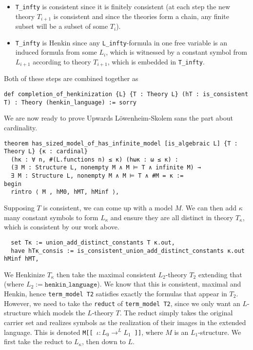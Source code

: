 \begin{itemize}
  \item
        \texttt{T\_infty} is consistent since it is finitely consistent
        (at each step the new theory $T_{i+1}$ is consistent
        and since the theories form a chain,
        any finite subset will be a subset of some $T_{i}$).
  \item
        \texttt{T\_infty} is Henkin since any \texttt{L\_infty}-formula in one free variable
        is an induced formula from some $L_{i}$, which is witnessed by a constant symbol
        from $L_{i+1}$ according to theory $T_{i+1}$, which is embedded in \texttt{T\_infty}.
\end{itemize}

Both of these steps are combined together as

\begin{lstlisting}
def completion_of_henkinization {L} {T : Theory L} (hT : is_consistent T) : Theory (henkin_language) := sorry
\end{lstlisting}

We are now ready to prove Upwards L\"{o}wenheim-Skolem
sans the part about cardinality.

\begin{lstlisting}
theorem has_sized_model_of_has_infinite_model [is_algebraic L] {T : Theory L} {κ : cardinal}
  (hκ : ∀ n, #(L.functions n) ≤ κ) (hωκ : ω ≤ κ) :
  (∃ M : Structure L, nonempty M ∧ M ⊨ T ∧ infinite M) →
  ∃ M : Structure L, nonempty M ∧ M ⊨ T ∧ #M = κ :=
begin
  rintro ⟨ M , hM0, hMT, hMinf ⟩, \end{lstlisting}

Supposing $T$ is consistent, we can come up with a model $M$.
We can then add $\kappa$ many constant symbols to form $L_\kappa$
and ensure they are all distinct in theory $T_\kappa$,
which is consistent by our work above.
\begin{lstlisting}
  set Tκ := union_add_distinct_constants T κ.out,
  have hTκ_consis := is_consistent_union_add_distinct_constants κ.out hMinf hMT, \end{lstlisting}
We Henkinize $T_\kappa$ then take the maximal consistent $L_{2}$-theory $T_{2}$
extending that (where $L_{2} := \texttt{henkin\_language}$).
We know that this is consistent, maximal and Henkin,
hence \texttt{term\_model T2} satisfies exactly the formulas
that appear in $T_{2}$.
However, we need to take the \texttt{reduct} of \texttt{term\_model T2},
since we only want an $L$-structure which models the $L$-theory $T$.
The reduct simply takes the original carrier set and realizes symbols
as the realization of their images in the extended language.
This is denoted \texttt{M[[ $\iota : L_{0} \to^{L} L_{1}$ ]]}, where $M$ is
an $L_{1}$-structure.
We first take the reduct to $L_{\kappa}$, then down to $L$.

